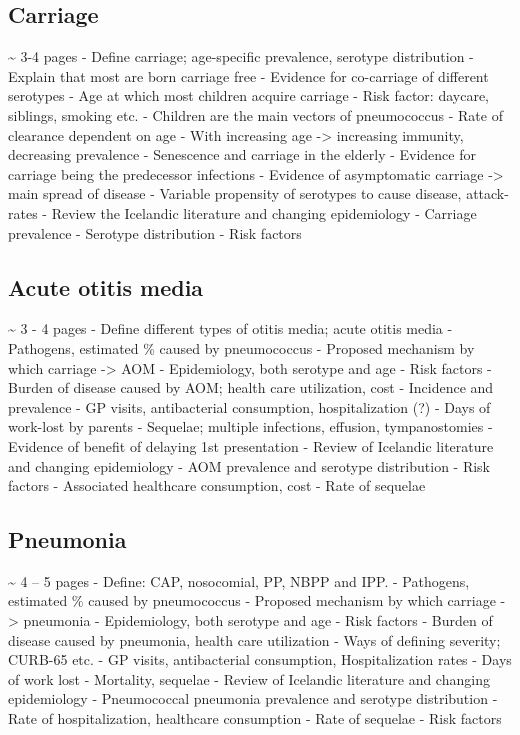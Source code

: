 \documentclass[]{book}
\theoremstyle{definition}
\theoremstyle{definition}
\theoremstyle{definition}
\theoremstyle{remark}
\begin{document}
\subsection{Carriage}\label{carriage}

\textasciitilde{} 3-4 pages - Define carriage; age-specific prevalence,
serotype distribution - Explain that most are born carriage free -
Evidence for co-carriage of different serotypes - Age at which most
children acquire carriage - Risk factor: daycare, siblings, smoking etc.
- Children are the main vectors of pneumococcus - Rate of clearance
dependent on age - With increasing age -\textgreater{} increasing
immunity, decreasing prevalence - Senescence and carriage in the elderly
- Evidence for carriage being the predecessor infections - Evidence of
asymptomatic carriage -\textgreater{} main spread of disease - Variable
propensity of serotypes to cause disease, attack-rates - Review the
Icelandic literature and changing epidemiology - Carriage prevalence -
Serotype distribution - Risk factors

\subsection{Acute otitis media}\label{acute-otitis-media}

\textasciitilde{} 3 - 4 pages - Define different types of otitis media;
acute otitis media - Pathogens, estimated \% caused by pneumococcus -
Proposed mechanism by which carriage -\textgreater{} AOM - Epidemiology,
both serotype and age - Risk factors - Burden of disease caused by AOM;
health care utilization, cost - Incidence and prevalence - GP visits,
antibacterial consumption, hospitalization (?) - Days of work-lost by
parents - Sequelae; multiple infections, effusion, tympanostomies -
Evidence of benefit of delaying 1st presentation - Review of Icelandic
literature and changing epidemiology - AOM prevalence and serotype
distribution - Risk factors - Associated healthcare consumption, cost -
Rate of sequelae

\subsection{Pneumonia}\label{pneumonia}

\textasciitilde{} 4 -- 5 pages - Define: CAP, nosocomial, PP, NBPP and
IPP. - Pathogens, estimated \% caused by pneumococcus - Proposed
mechanism by which carriage -\textgreater{} pneumonia - Epidemiology,
both serotype and age - Risk factors - Burden of disease caused by
pneumonia, health care utilization - Ways of defining severity; CURB-65
etc. - GP visits, antibacterial consumption, Hospitalization rates -
Days of work lost - Mortality, sequelae - Review of Icelandic literature
and changing epidemiology - Pneumococcal pneumonia prevalence and
serotype distribution - Rate of hospitalization, healthcare consumption
- Rate of sequelae - Risk factors
\end{document}
